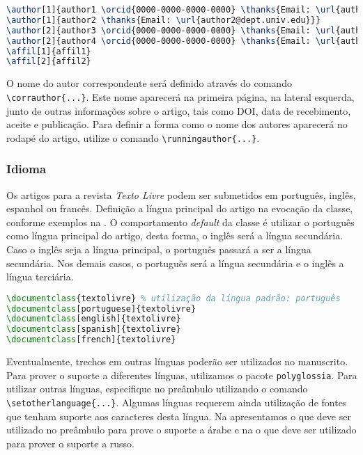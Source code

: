 \documentclass[portuguese]{textolivre}
\begin{document}
\begin{lstlisting}[language=tex, label=lst-authors, caption={Definição dos autores do manuscrito.},postbreak=\mbox{$\hookrightarrow$\space}]
\author[1]{author1 \orcid{0000-0000-0000-0000} \thanks{Email: \url{author1@dept.univ.edu}}}
\author[1]{author2 \thanks{Email: \url{author2@dept.univ.edu}}}
\author[2]{author3 \orcid{0000-0000-0000-0000} \thanks{Email: \url{author3@inst.gov}}}
\author[2]{author4 \orcid{0000-0000-0000-0000} \thanks{Email: \url{author4@inst.gov}}}
\affil[1]{affil1}
\affil[2]{affil2}
\end{lstlisting} %

O nome do autor correspondente será definido através do comando \verb|\corrauthor{...}|. 
Este nome aparecerá na primeira página, na lateral esquerda, junto de outras informações sobre o artigo,
tais como DOI, data de recebimento, aceite e publicação.
Para definir a forma como o nome dos autores aparecerá no rodapé do artigo, utilize o comando \verb|\runningauthor{...}|.

\subsubsection{Idioma}\label{sec-idioma}
Os artigos para a revista \textit{Texto Livre} podem ser submetidos em português, inglês,
espanhol ou francês. Definição a língua principal do artigo na evocação da classe, conforme exemplos na
. O comportamento \textit{default} da classe é utilizar o português como língua principal do artigo,
desta forma, o inglês será a língua secundária. Caso o inglês seja a língua principal, o português passará a ser a língua secundária.
Nos demais casos, o português será a língua secundária e o inglês a língua terciária.

\begin{lstlisting}[language=tex, label=lst-language, caption={Definição da língua principal do artigo.},postbreak=\mbox{$\hookrightarrow$\space}]
\documentclass{textolivre} % utilização da língua padrão: português
\documentclass[portuguese]{textolivre}
\documentclass[english]{textolivre}
\documentclass[spanish]{textolivre}
\documentclass[french]{textolivre}
\end{lstlisting}

Eventualmente, trechos em outras línguas poderão ser utilizados no manuscrito. Para prover o suporte a diferentes línguas,
utilizamos o pacote \verb|polyglossia|. Para utilizar outras línguas, especifique no preâmbulo utilizando o 
comando \verb|\setotherlanguage{...}|. Algumas línguas requerem ainda utilização de fontes que tenham suporte
aos caracteres desta língua. Na  apresentamos o que deve ser utilizado no preâmbulo para 
prove o suporte a árabe e na  o que deve ser utilizado para prover o suporte a russo.
\end{document}
